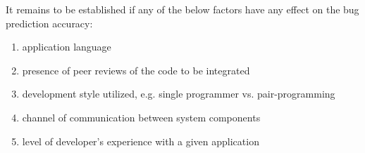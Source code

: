 It remains to be established if any of the below factors have any effect on the bug prediction accuracy:
\begin{enumerate}
\item application language
\item presence of peer reviews of the code to be integrated
\item development style utilized, e.g. single programmer vs. pair-programming
\item channel of communication between system components
\item \label{developerMastery}level of developer's experience with a given application
\end{enumerate}